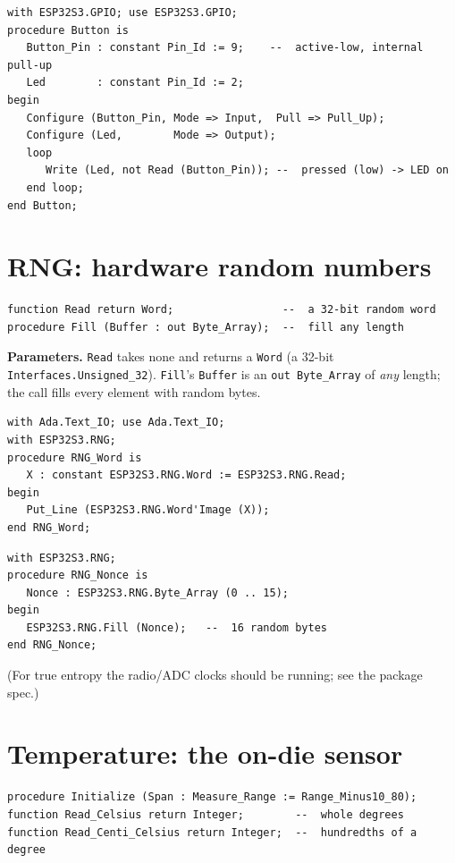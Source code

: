 \begin{lstlisting}
with ESP32S3.GPIO; use ESP32S3.GPIO;
procedure Button is
   Button_Pin : constant Pin_Id := 9;    --  active-low, internal pull-up
   Led        : constant Pin_Id := 2;
begin
   Configure (Button_Pin, Mode => Input,  Pull => Pull_Up);
   Configure (Led,        Mode => Output);
   loop
      Write (Led, not Read (Button_Pin)); --  pressed (low) -> LED on
   end loop;
end Button;
\end{lstlisting}

\section{RNG: hardware random numbers}

\begin{lstlisting}
function Read return Word;                 --  a 32-bit random word
procedure Fill (Buffer : out Byte_Array);  --  fill any length
\end{lstlisting}

\textbf{Parameters.} \texttt{Read} takes none and returns a \texttt{Word} (a 32-bit
\texttt{Interfaces.Unsigned\_32}). \texttt{Fill}'s \texttt{Buffer} is an
\texttt{out Byte\_Array} of \emph{any} length; the call fills every element with
random bytes.

\begin{lstlisting}
with Ada.Text_IO; use Ada.Text_IO;
with ESP32S3.RNG;
procedure RNG_Word is
   X : constant ESP32S3.RNG.Word := ESP32S3.RNG.Read;
begin
   Put_Line (ESP32S3.RNG.Word'Image (X));
end RNG_Word;
\end{lstlisting}

\begin{lstlisting}
with ESP32S3.RNG;
procedure RNG_Nonce is
   Nonce : ESP32S3.RNG.Byte_Array (0 .. 15);
begin
   ESP32S3.RNG.Fill (Nonce);   --  16 random bytes
end RNG_Nonce;
\end{lstlisting}

(For true entropy the radio/ADC clocks should be running; see the package spec.)

\section{Temperature: the on-die sensor}

\begin{lstlisting}
procedure Initialize (Span : Measure_Range := Range_Minus10_80);
function Read_Celsius return Integer;        --  whole degrees
function Read_Centi_Celsius return Integer;  --  hundredths of a degree
\end{lstlisting}

